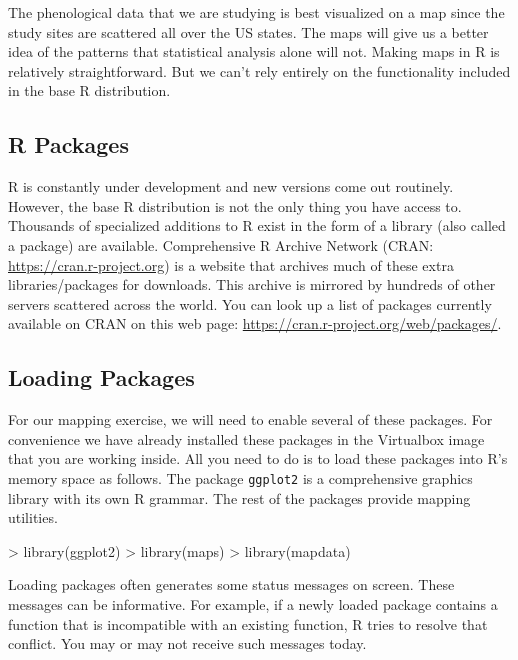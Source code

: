\documentclass[11pt,twosided]{article}
\begin{document}
The phenological data that we are studying is best visualized on a map since the study sites are scattered all over the US states.  The maps will give us a better idea of the patterns that statistical analysis alone will not.  Making maps in R is relatively straightforward.  But we can't rely entirely on the functionality included in the base R distribution.  \\

\subsection{R Packages}
R is constantly under development and new versions come out routinely.  However, the base R distribution is not the only thing you have access to.  Thousands of specialized additions to R exist in the form of a library (also called a package) are available.  Comprehensive R Archive Network (CRAN: \url{https://cran.r-project.org}) is a website that archives much of these extra libraries/packages for downloads.  This archive is mirrored by hundreds of other servers scattered across the world.  You can look up a list of packages currently available on CRAN on this web page: \url{https://cran.r-project.org/web/packages/}.\\


\subsection{Loading Packages}
For our mapping exercise, we will need to enable several of these packages.  For convenience we have already installed these packages in the Virtualbox image that you are working inside.  All you need to do is to load these packages into R's memory space as follows.  The package {\tt ggplot2} is a comprehensive graphics library with its own R grammar.  The rest of the packages provide mapping utilities.\\

\begin{tcolorbox}[breakable,boxrule=0.5pt,enhanced]
\begin{code}

> library(ggplot2)
> library(maps)
> library(mapdata)

\end{code}
\end{tcolorbox}
\vspace{2ex}
 
Loading packages often generates some status messages on screen.  These messages can be informative.  For example, if a newly loaded package contains a function that is incompatible with an existing function, R tries to resolve that conflict.  You may or may not receive such messages today.\\
\end{document}
